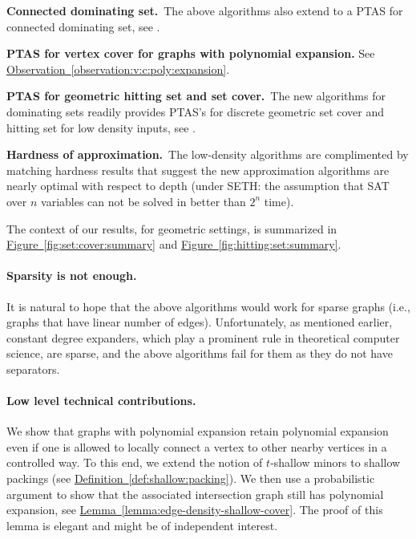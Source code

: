 \documentclass[12pt]{article}
\newcommand{\Term}[1]{\textsf{#1}}
\theoremstyle{remark}\theoremheaderfont{\sf}\theorembodyfont{\upshape}
\numberwithin{figure}{section}\numberwithin{table}{section}\numberwithin{equation}{section}
\newcommand{\HLink}[2]{\hyperref[#2]{#1~\ref*{#2}}}
\newcommand{\figref}[1]{\HLink{Figure}{fig:#1}}
\newcommand{\defref}[1]{\HLink{Definition}{def:#1}}
\newcommand{\lemref}[1]{\HLink{Lemma}{lemma:#1}}
\newcommand{\obsref}[1]{\HLink{Observation}{observation:#1}}
\newcommand{\SETH}{\Term{SETH}\xspace}
\newcommand{\ProblemC}[1]{\textsf{#1}}
\newcommand{\PTAS}{\Term{PTAS}\xspace}
\begin{document}
\begin{compactenum}[(A)]
\item \textbf{Connected dominating set.}~The above algorithms also extend to a \PTAS for connected dominating
  set, see .

\item \textbf{\PTAS for vertex cover for graphs with polynomial
    expansion.} See \obsref{v:c:poly:expansion}.


\item \textbf{\PTAS for geometric hitting set and set cover.}~The new algorithms for dominating sets readily provides \PTAS's for
  discrete geometric set cover and hitting set for low density inputs,
  see .

\item \textbf{Hardness of approximation.}~The low-density algorithms
  are complimented by matching hardness results that suggest the new
  approximation algorithms are nearly optimal with respect to depth
  (under \SETH: the assumption that \ProblemC{SAT} over $n$ variables
  can not be solved in better than $2^n$ time).
\end{compactenum}
\smallskip The context of our results, for geometric settings, is summarized in
\figref{set:cover:summary} and \figref{hitting:set:summary}.

\paragraph{Sparsity is not enough.}

It is natural to hope that the above algorithms would work for sparse
graphs (i.e., graphs that have linear number of edges). Unfortunately,
as mentioned earlier, constant degree expanders, which play a
prominent rule in theoretical computer science, are sparse, and the
above algorithms fail for them as they do not have separators.

\paragraph{Low level technical contributions.}

We show that graphs with polynomial expansion retain polynomial
expansion even if one is allowed to locally connect a vertex to other
nearby vertices in a controlled way. To this end, we extend the notion
of $t$-shallow minors to shallow packings (see
\defref{shallow:packing}). We then use a probabilistic argument to
show that the associated intersection graph still has polynomial
expansion, see \lemref{edge-density-shallow-cover}. The proof of this
lemma is elegant and might be of independent interest.
\end{document}
